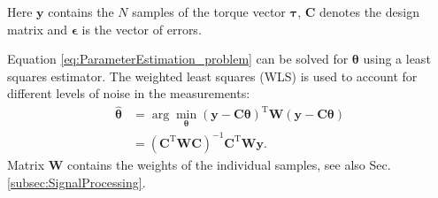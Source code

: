 Here $\boldsymbol{y}$ contains the $N$ samples of the torque vector $\boldsymbol{\tau}$, $\boldsymbol{C}$ denotes the design matrix and $\boldsymbol{\epsilon}$ is the vector of errors.

Equation \eqref{eq:ParameterEstimation_problem} can be solved for $\boldsymbol{\theta}$ using a least squares estimator. The weighted least squares (WLS)  \cite{Gautier.2013,M.Gautier.1995,V.Bargsten.2013,Swevers.1997} is used to account for different levels of noise in the measurements: 
\begin{equation} \label{eq:ParameterEstimation_WLS}
    \begin{aligned}
	    \hat{\boldsymbol{\theta}} &= \arg \min_{{\boldsymbol{\theta}}} (\boldsymbol{y} - \boldsymbol{C} \boldsymbol{\theta})^\mathrm{T} \boldsymbol{W} (\boldsymbol{y} - \boldsymbol{C} \boldsymbol{\theta}) \\
	    &= (\boldsymbol{C}^\mathrm{T} \boldsymbol{W} \boldsymbol{C})^{-1} \boldsymbol{C}^\mathrm{T} \boldsymbol{W} \boldsymbol{y}.
	\end{aligned}
\end{equation}
Matrix $\boldsymbol{W}$ contains the weights of the individual samples, see also Sec.\,\ref{subsec:SignalProcessing}.
